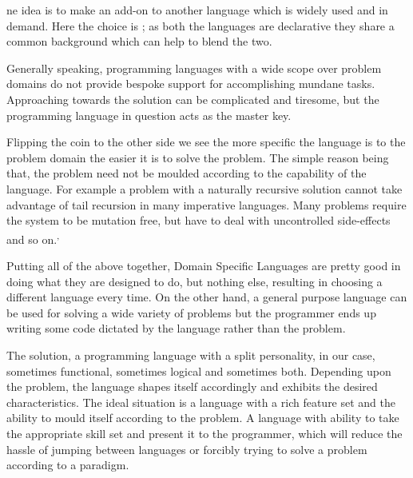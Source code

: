 \documentclass[thesis-solanki.tex]{subfiles}
\begin{document}
ne idea is to make  an add-on to another language which is widely used and in demand.
Here the choice is ; as both the languages are declarative they share a common background which can
help to blend the two.

Generally speaking, programming languages with a wide scope over problem domains do not provide bespoke support for
accomplishing  mundane tasks.
Approaching towards the solution can be complicated and tiresome, but the programming language in question acts as the
master key.%

Flipping the coin to the other side\yyy{}{,} we see\xxx{,} the more specific the language is to the problem domain\yyy{}{,} the easier it
is to solve the problem.
The simple reason being that, the problem need not be moulded according to the capability  of the
language.
For example\yyy{}{,} a problem with a naturally recursive solution cannot take advantage of tail recursion in many
imperative languages.
Many problems require the system to be mutation free, but have to deal with uncontrolled side-effects and so
on.\textsuperscript{,}%

Putting all of the above together, Domain Specific Languages are pretty good in doing what they are designed to do,
but nothing else, resulting in choosing a different language every time.
On the other hand, a general purpose language can be used for solving a wide variety of problems but 
the programmer ends up writing some code dictated by the language rather than the problem.

\par The solution, a programming language with a split personality, in our case, sometimes functional, sometimes logical and sometimes both. 
Depending upon the problem, the language shapes itself accordingly and exhibits the desired characteristics. The ideal situation is a language with a rich 
feature set and the ability to mould itself according to the problem. A language with ability to take the appropriate skill set and present it to the 
programmer, which will reduce the hassle of jumping between languages or forcibly trying to solve a problem according to a paradigm.
\end{document}
